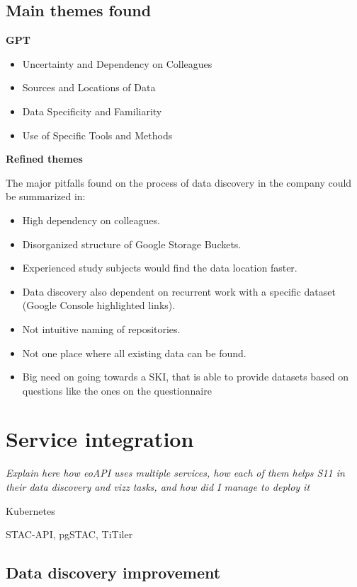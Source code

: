 \documentclass[
  oneside,
  open=any]{scrbook}
\providecommand{\tightlist}{%
  \setlength{\itemsep}{0pt}\setlength{\parskip}{0pt}}\usepackage{longtable,booktabs,array}
\begin{document}
\subsection{Main themes found}\label{main-themes-found}

\textbf{GPT}

\begin{itemize}
\tightlist
\item
  Uncertainty and Dependency on Colleagues
\item
  Sources and Locations of Data
\item
  Data Specificity and Familiarity
\item
  Use of Specific Tools and Methods
\end{itemize}

\textbf{Refined themes}

The major pitfalls found on the process of data discovery in the company
could be summarized in:

\begin{itemize}
\tightlist
\item
  High dependency on colleagues.
\item
  Disorganized structure of Google Storage Buckets.
\item
  Experienced study subjects would find the data location faster.
\item
  Data discovery also dependent on recurrent work with a specific
  dataset (Google Console highlighted links).
\item
  Not intuitive naming of repositories.
\item
  Not one place where all existing data can be found.
\item
  Big need on going towards a SKI, that is able to provide datasets
  based on questions like the ones on the questionnaire
\end{itemize}

\section{Service integration}\label{service-integration}

\emph{Explain here how eoAPI uses multiple services, how each of them
helps S11 in their data discovery and vizz tasks, and how did I manage
to deploy it}

Kubernetes

STAC-API, pgSTAC, TiTiler

\subsection{Data discovery
improvement}\label{data-discovery-improvement}
\end{document}
